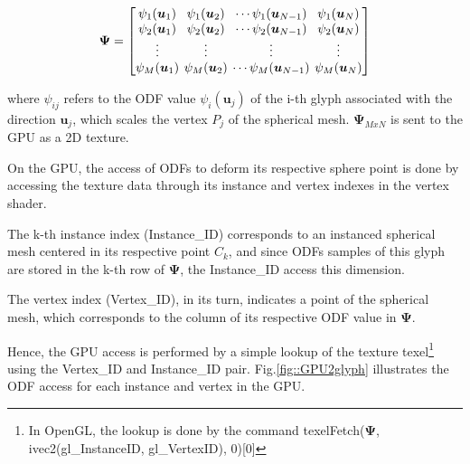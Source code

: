 \documentclass[twoside,twocolumn,10pt]{article}
\begin{document}
\begin{equation}
\label{eq::Psi}
\bm{\Psi} = 
\begingroup %
\setlength\arraycolsep{2pt}
\begin{bmatrix} 
    \psi_1(\bm{u}_1) & \psi_1(\bm{u}_2) & \cdots \psi_1(\bm{u}_{N-1}) & \psi_1(\bm{u}_{N})  \\    
     \psi_2(\bm{u}_1)& \psi_2(\bm{u}_2) & \cdots \psi_2(\bm{u}_{N-1}) & \psi_2(\bm{u}_{N}) \\
    \vdots & \vdots & \vdots & \vdots  \\    
     \psi_M(\bm{u}_1)&\psi_M(\bm{u}_2) & \cdots \psi_M(\bm{u}_{N-1}) & \psi_M(\bm{u}_{N})
\end{bmatrix}
\endgroup
\end{equation}

where $\psi_{ij}$ refers to the ODF value $\psi_i(\bm{u}_j)$ of the i-th glyph associated with the direction $\bm{u}_j$, which scales the  vertex $P_j$ of the spherical mesh. $\bm{\Psi}_{MxN}$ is sent to the GPU as a 2D texture.

On the GPU, the access of ODFs to deform its respective sphere point is done by accessing the texture data through its instance and vertex indexes in the vertex shader.

The k-th instance index (Instance\_ID) corresponds to an instanced spherical mesh centered in its respective point $C_k$, and since ODFs samples of this glyph are stored in the k-th row of $\bm{\Psi}$, the Instance\_ID access this dimension.

The vertex index (Vertex\_ID), in its turn, indicates a point of the spherical mesh, which corresponds to the column of its respective ODF value in $\bm{\Psi}$.

Hence, the GPU access is performed by a simple lookup of the texture texel\footnote{In OpenGL, the lookup is done by the command texelFetch($\bm{\Psi}$, ivec2(gl\_InstanceID, gl\_VertexID), 0)[0]} using the Vertex\_ID and Instance\_ID pair. Fig.\ref{fig::GPU2glyph} illustrates the ODF access for each instance and vertex in the GPU.

\end{document}
